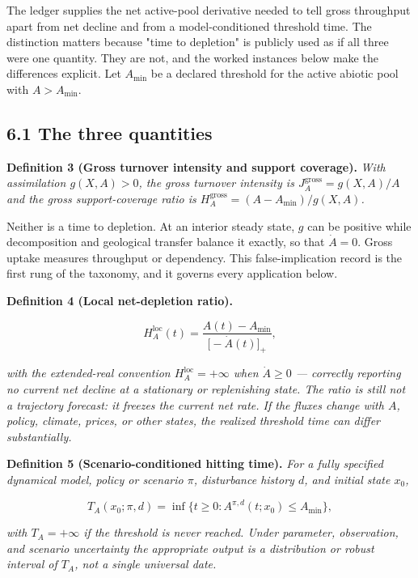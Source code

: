 \documentclass[11pt]{article}
\begin{document}
The ledger supplies the net active-pool derivative needed to tell gross throughput apart from net decline and from a model-conditioned threshold time. The distinction matters because "time to depletion" is publicly used as if all three were one quantity. They are not, and the worked instances below make the differences explicit. Let \(A_{\min}\) be a declared threshold for the active abiotic pool with \(A > A_{\min}\).

\subsection*{6.1 The three quantities}\label{61-the-three-quantities}

\textbf{Definition 3 (Gross turnover intensity and support coverage).} \emph{With assimilation \(g(X,A) > 0\), the gross turnover intensity is \(J_A^{\mathrm{gross}} =\allowbreak{} g(X,\allowbreak{}A)/A\) and the gross support-coverage ratio is \(H_A^{\mathrm{gross}} =\allowbreak{} (A - A_{\min})/g(X,\allowbreak{}A)\).}

Neither is a time to depletion. At an interior steady state, \(g\) can be positive while decomposition and geological transfer balance it exactly, so that \(\dot A=0\). Gross uptake measures throughput or dependency. This false-implication record is the first rung of the taxonomy, and it governs every application below.

\textbf{Definition 4 (Local net-depletion ratio).} 

$$H_A^{\mathrm{loc}}(t) = \frac{A(t) - A_{\min}}{\bigl[ -\dot A(t) \bigr]_+},$$

 \emph{with the extended-real convention \(H_A^{\mathrm{loc}} = +\infty\) when \(\dot A \ge 0\) --- correctly reporting no current net decline at a stationary or replenishing state. The ratio is still not a trajectory forecast: it freezes the current net rate. If the fluxes change with \(A\), policy, climate, prices, or other states, the realized threshold time can differ substantially.}

\textbf{Definition 5 (Scenario-conditioned hitting time).} \emph{For a fully specified dynamical model, policy or scenario \(\pi\), disturbance history \(d\), and initial state \(x_0\),} 

$$T_A(x_0; \pi, d) = \inf\{ t \ge 0 : A^{\pi,d}(t; x_0) \le A_{\min} \},$$

 \emph{with \(T_A = +\infty\) if the threshold is never reached. Under parameter, observation, and scenario uncertainty the appropriate output is a distribution or robust interval of \(T_A\), not a single universal date.}
\end{document}
